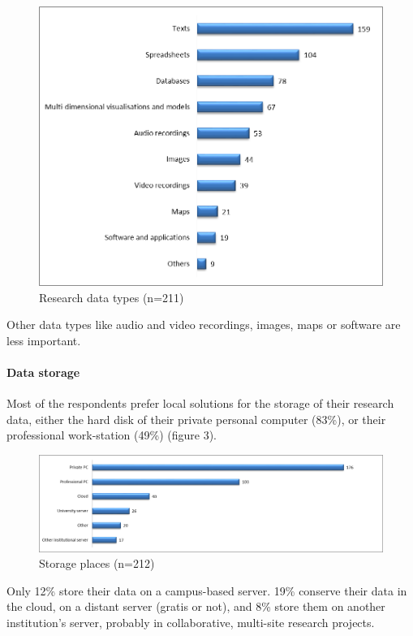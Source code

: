 \documentclass[a4paper,
fontsize=11pt,
oneside,
numbers=noperiodatend,
parskip=half-,
bibliography=totoc,
final
]{scrartcl}
\begin{document}
\begin{figure}[htbp]
\centering
\includegraphics{figures/media/image2.png}
\caption{Research data types (n=211)}
\end{figure}

Other data types like audio and video recordings, images, maps or
software are less important.

\paragraph{Data storage}\label{data-storage}

Most of the respondents prefer local solutions for the storage of their
research data, either the hard disk of their private personal computer
(83\%), or their professional work-station (49\%) (figure 3).

\begin{figure}[htbp]
\centering
\includegraphics{figures/media/image3.png}
\caption{Storage places (n=212)}
\end{figure}

Only 12\% store their data on a campus-based server. 19\% conserve their
data in the cloud, on a distant server (gratis or not), and 8\% store
them on another institution's server, probably in collaborative,
multi-site research projects.
\end{document}
